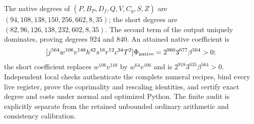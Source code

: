 The native degrees of $(P,B_P,D_f,Q,V,C_y,S,Z)$ are
$(94,108,138,150,256,662,8,35)$; the short degrees are
$(82,96,126,138,232,602,8,35)$. The second term of the output uniquely
dominates, proving degrees $924$ and $840$.
An attained native coefficient is
\[
 [j^{564}w^{106}v^{148}h^{42}s^{16}r^{12}c^{34}T^2]\Phi_{\rm native}
       =2^{960}3^{677}\beta^{564}>0;
\]
the short coefficient replaces $w^{106}v^{148}$ by $w^{64}v^{106}$
and is $2^{918}3^{635}\beta^{564}>0$.
Independent local checks authenticate the complete numeral recipes,
bind every live register, prove the coprimality and rescaling identities,
and certify exact degree and costs under normal and optimized Python.
The finite audit is explicitly separate from the retained unbounded
ordinary arithmetic and consistency calibration.
